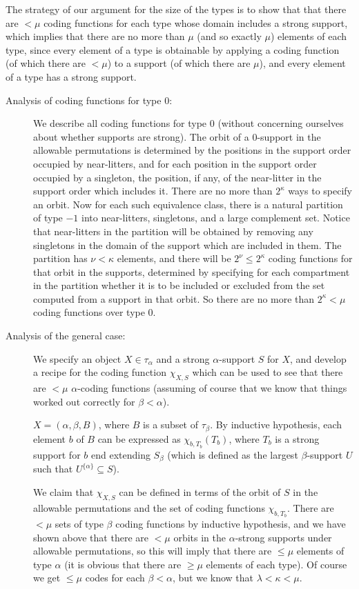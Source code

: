 \documentclass[112pt]{article}
\begin{document}
The strategy of our argument for the size of the types is to show that that there are $<\mu$ coding functions for each type whose domain includes a strong support, which implies that there are no more than $\mu$ (and so exactly $\mu$) elements of each type, since every element of a type is obtainable by applying a coding function (of which there are $<\mu$) to a support (of which there are $\mu$), and every element of a type has a strong support.

\begin{description}

\item[Analysis of coding functions for type 0:]  We describe all coding functions for type 0 (without concerning ourselves about whether supports are strong).  The orbit of a 0-support in the allowable permutations is determined by the positions in the support order occupied by near-litters, and for each position in the support order occupied by a singleton, the position, if any, of the near-litter in the support order which includes it.  There are no more than $2^\kappa$ ways to specify an orbit.  Now for each such equivalence class, there is a natural partition of type $-1$ into near-litters, singletons, and a large complement set.  Notice that near-litters in the partition will be obtained by removing any singletons in the domain of the support which are included in them.  The partition has $\nu<\kappa$ elements, and there will be $2^\nu\leq 2^\kappa$ coding functions for that orbit in the supports, determined by specifying for each compartment in the partition whether it is to be included or excluded from the set computed from a support in that orbit.  So there are no more than $2^\kappa<\mu$ coding functions over type 0.

\item[Analysis of the general case:]  We specify an object $X\in \tau_\alpha$ and a strong $\alpha$-support $S$ for $X$, and develop a recipe for the coding function $\chi_{X,S}$ which can be used to see that there are $<\mu$ $\alpha$-coding functions (assuming of course that we know that things worked out correctly for $\beta<\alpha$).

$X = (\alpha,\beta,B)$, where $B$ is a subset of $\tau_\beta$.  By inductive hypothesis, each element $b$ of $B$ can be expressed as $\chi_{b,T_b}(T_b)$, where $T_b$ is a strong support for $b$ end extending $S_\beta$ (which is defined as the largest $\beta$-support $U$ such that $U^{\{\alpha\}} \subseteq S$).

We claim that $\chi_{X,S}$ can be defined in terms of the orbit of $S$ in the allowable permutations and the set of coding functions $\chi_{b,T_b}$.  There are $<\mu$ sets of type $\beta$ coding functions by inductive hypothesis, and we have shown above that there are $<\mu$ orbits in the $\alpha$-strong supports under allowable permutations, so this will imply that there are $\leq \mu$ elements of type $\alpha$ (it is obvious that there are $\geq \mu$ elements of each type).
Of course we get $\leq \mu$ codes for each $\beta<\alpha$, but we know that $\lambda<\kappa<\mu$.


\end{description}
\end{document}
